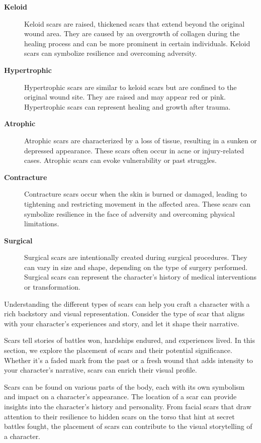 \begin{description}
    \item[\textbf{Keloid}] Keloid scars are raised, thickened scars that extend beyond the original wound area. They are caused by an overgrowth of collagen during the healing process and can be more prominent in certain individuals. Keloid scars can symbolize resilience and overcoming adversity.
    \item[\textbf{Hypertrophic}] Hypertrophic scars are similar to keloid scars but are confined to the original wound site. They are raised and may appear red or pink. Hypertrophic scars can represent healing and growth after trauma.
    \item[\textbf{Atrophic}] Atrophic scars are characterized by a loss of tissue, resulting in a sunken or depressed appearance. These scars often occur in acne or injury-related cases. Atrophic scars can evoke vulnerability or past struggles.
    \item[\textbf{Contracture}] Contracture scars occur when the skin is burned or damaged, leading to tightening and restricting movement in the affected area. These scars can symbolize resilience in the face of adversity and overcoming physical limitations.
    \item[\textbf{Surgical}] Surgical scars are intentionally created during surgical procedures. They can vary in size and shape, depending on the type of surgery performed. Surgical scars can represent the character's history of medical interventions or transformation.
\end{description}

Understanding the different types of scars can help you craft a character with a rich backstory and visual representation. Consider the type of scar that aligns with your character's experiences and story, and let it shape their narrative.

Scars tell stories of battles won, hardships endured, and experiences lived. In this section, we explore the placement of scars and their potential significance. Whether it's a faded mark from the past or a fresh wound that adds intensity to your character's narrative, scars can enrich their visual profile.

Scars can be found on various parts of the body, each with its own symbolism and impact on a character's appearance. The location of a scar can provide insights into the character's history and personality. From facial scars that draw attention to their resilience to hidden scars on the torso that hint at secret battles fought, the placement of scars can contribute to the visual storytelling of a character.

